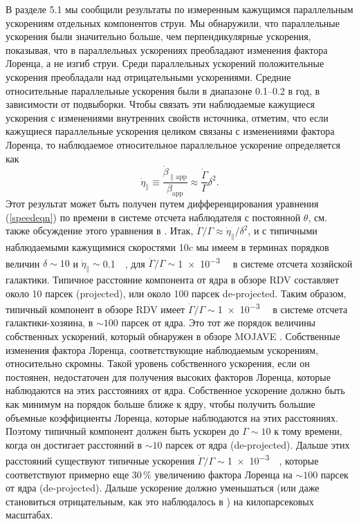 В разделе 5.1 мы сообщили результаты по измеренным кажущимся параллельным ускорениям отдельных
компонентов струи. Мы обнаружили, что параллельные ускорения были значительно больше, чем
перпендикулярные ускорения, показывая, что в параллельных ускорениях преобладают изменения фактора
Лоренца, а не изгиб струи. Среди параллельных ускорений положительные ускорения преобладали над
отрицательными ускорениями. Средние относительные параллельные ускорения были в диапазоне 0.1--0.2
в год, в зависимости от подвыборки. Чтобы связать эти наблюдаемые кажущиеся ускорения с изменениями
внутренних свойств источника, отметим, что если кажущиеся параллельные ускорения целиком связаны с
изменениями фактора Лоренца, то наблюдаемое относительное параллельное ускорение определяется как
\begin{equation}
\dot{\eta}_{\parallel}\equiv\frac{\dot{\beta}_\mathrm{\parallel app}}{\beta_\mathrm{app}}\approx
\frac{\dot{\Gamma}}{\Gamma}\delta^{2}.
\end{equation}
Этот результат может быть получен путем дифференцирования уравнения (\ref{speedeqn}) по времени в
системе отсчета наблюдателя с постоянной $\theta$, см. также обсуждение этого уравнения в
\cite{Homan_2009}. Итак, $\dot{\Gamma}/\Gamma\approx\dot{\eta}_{\parallel}/\delta^{2}$, и с
типичными наблюдаемыми кажущимися скоростями 10$c$ мы имеем в терминах порядков величин $\delta\sim
10$ и $\dot{\eta}_{\parallel}\sim $\SI{0.1}{\per\year}, для
$\dot{\Gamma}/\Gamma\sim$\SI{1e-3}{\per\year} в системе отсчета хозяйской галактики.
Типичное расстояние компонента от ядра в обзоре RDV составляет около 10 парсек (projected),
или около 100 парсек de-projected. Таким образом, типичный компонент в обзоре RDV имеет
$\dot{\Gamma}/\Gamma\sim$\SI{1e-3}{\per\year} в системе отсчета галактики-хозяина, в $\sim100$
парсек от ядра. Это тот же порядок величины собственных ускорений, который обнаружен в обзоре
MOJAVE \cite{Homan_2009}. Собственные изменения фактора Лоренца, соответствующие наблюдаемым
ускорениям, относительно скромны. Такой уровень собственного ускорения, если он постоянен,
недостаточен для получения высоких факторов Лоренца, которые наблюдаются на этих расстояниях от
ядра. Собственное ускорение должно быть как минимум на порядок больше ближе к ядру, чтобы получить
большие объемные коэффициенты Лоренца, которые наблюдаются на этих расстояниях. Поэтому типичный
компонент должен быть ускорен до $\Gamma\sim10$ к тому времени, когда он достигает расстояний в
$\sim10 $ парсек от ядра (de-projected). Дальше этих расстояний существуют типичные
ускорения $\dot{\Gamma}/\Gamma\sim$\SI{1e-3}{\per\year}, которые соответствуют
примерно еще 30\,\% увеличению фактора Лоренца на $\sim 100$ парсек от ядра
(de-projected). Дальше ускорение должно уменьшаться (или даже становиться отрицательным,
как это наблюдалось в \cite{Homan_2009}) на килопарсековых масштабах.


